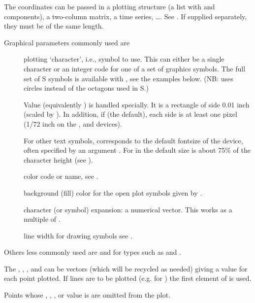 \begin{Details}\relax
The coordinates can be passed in a plotting structure
(a list with  and  components), a two-column matrix, a
time series, \dots.  See .  If supplied
separately, they must be of the same length.

Graphical parameters commonly used are
\begin{description}

\item[] plotting `character', i.e., symbol to use.
This can either be a single character or an integer code for one
of a set of graphics symbols.  The full set of S symbols is
available with , see the examples below.
(NB: \R{} uses circles instead of the octagons used in S.)

Value  (equivalently ) is handled
specially.  It is a rectangle of side 0.01 inch (scaled by
).  In addition, if  (the default), each
side is at least one pixel (1/72 inch on the ,
 and  devices).

For other text symbols,  corresponds to the default
fontsize of the device, often specified by an argument
.  For  in  the default size
is about 75\% of the character height (see ).

\item[] color code or name, see .
\item[] background (fill) color for the open plot
symbols given by .
\item[] character (or symbol) expansion: a numerical vector.
This works as a multiple of .
\item[] line width for drawing symbols see .

\end{description}

Others less commonly used are  and  for
types such as  and .

The  , , ,
 and  can be vectors (which will be recycled as
needed) giving a value for each point plotted.  If lines are to be
plotted (e.g. for ) the first element of 
is used.

Points whose , , ,  or 
value is  are omitted from the plot.
\end{Details}
